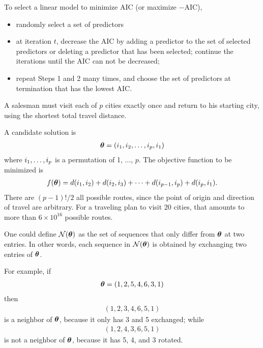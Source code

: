 \begin{frame}
  To select a linear model to minimize AIC (or maximize $-$AIC),
  
  \begin{itemize}
  \item randomly select a set of predictors
  \item at iteration $t$, decrease the AIC by adding a predictor to the set of selected predictors or deleting a predictor that has been selected; continue the iterations until the AIC can not be
    decreased;
  \item repeat Steps 1 and 2 many times, and choose the set of
    predictors at termination that has the lowest AIC.
  \end{itemize}
  
\end{frame}

\begin{frame}
  A salesman must visit each of $p$ cities exactly once and return
  to his starting city, using the shortest total travel distance.

  A candidate solution is
  \begin{align*}
    \boldsymbol{\theta} = (i_1, i_2, \ldots, i_p, i_1)
  \end{align*}
  where ${i}_1, \ldots, {i}_{p}$ is a permutation of 1, $\ldots$, $p$.
  The objective function to be minimized is
  \begin{align*}
    f(\boldsymbol{\theta}) = d(i_1, i_2) + d(i_2, i_3) + \cdots +
    d(i_{p-1}, i_p) + d(i_p,i_1).
  \end{align*}
  There are $(p-1)!/2$ all possible routes, since the point of
  origin and direction of travel are arbitrary.  For a traveling
  plan to visit $20$ cities, that amounts to more than 
  $6\times 10^{16}$ possible routes.
\end{frame}


\begin{frame}
  One could define $\mathcal{N}(\boldsymbol{\theta})$ as the set of sequences that
  only differ from $\boldsymbol{\theta}$ at two entries.  In other words, each
  sequence in $\mathcal{N}(\boldsymbol{\theta})$ is obtained by exchanging two entries
  of $\boldsymbol{\theta}$.
  
  For example, if
  \begin{align*}
    \boldsymbol{\theta} = (1, 2, 5, 4, 6, 3, 1)
  \end{align*}
  then
  \begin{align*}
    (1, 2, 3, 4, 6, 5, 1)
  \end{align*}
  is a neighbor of $\boldsymbol{\theta}$, because it only has 3 and 5
  exchanged; while
  \begin{align*}
    (1, 2, 4, 3, 6, 5, 1)
  \end{align*}
  is not a neighbor of $\boldsymbol{\theta}$, because it has 5, 4, and 3
  rotated.
\end{frame}


